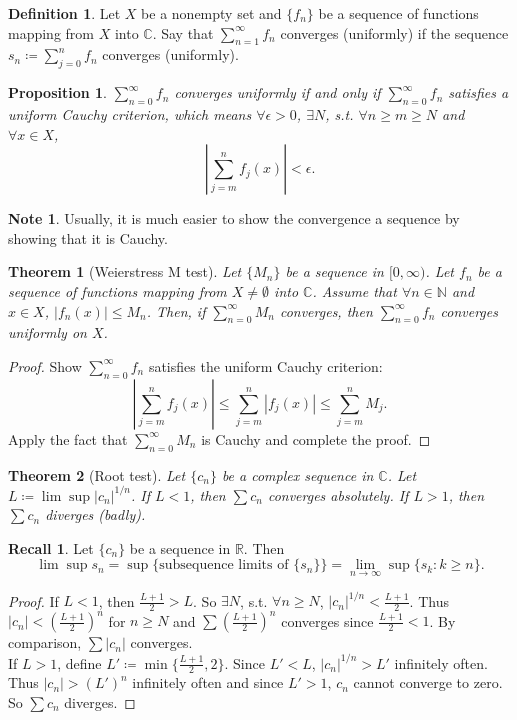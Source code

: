 \documentclass[12pt]{article}
\theoremstyle{plain}
\newtheorem{thm}{Theorem}
\newtheorem*{prop}{Proposition}
\theoremstyle{definition}
\newtheorem*{defn}{Definition}
\newtheorem*{note}{Note}
\newtheorem*{recall}{Recall}
\begin{document}
\begin{defn}
    Let $X$ be a nonempty set and $\{f_n\}$ be a sequence of functions mapping from $X$
    into $\mathbb{C}$.
    Say that $\sum_{n=1}^\infty f_n$ converges (uniformly) if the sequence
    $s_n\coloneqq\sum_{j=0}^n f_n$ converges (uniformly).
\end{defn}

\begin{prop}
    $\sum_{n=0}^\infty f_n$ converges uniformly if and only if
    $\sum_{n=0}^\infty f_n$ satisfies a uniform Cauchy criterion, which means
    $\forall \epsilon>0$, $\exists N$, s.t. $\forall n\geq m\geq N$ and $\forall
    x\in X$, 
    $$\left|\sum_{j=m}^n f_j(x)\right|<\epsilon.$$
\end{prop}
\begin{note}
    Usually, it is much easier to show the convergence a sequence by showing
    that it is Cauchy.
\end{note}

\begin{thm}[Weierstress M test]
    Let $\{M_n\}$ be a sequence in $[0,\infty)$.
    Let $f_n$ be a sequence of functions mapping from $X\neq\emptyset$ into
    $\mathbb{C}$.
    Assume that $\forall n\in \mathbb{N}$ and $x\in X$, $|f_n(x)|\leq M_n$.
    Then, if $\sum_{n=0}^\infty M_n$ converges, then $\sum_{n=0}^\infty f_n$ converges
    uniformly on $X$.
\end{thm}
\begin{proof}
    Show $\sum_{n=0}^\infty f_n$ satisfies the uniform Cauchy criterion:
    $$\left|\sum_{j=m}^n f_j(x)\right|
    \leq \sum_{j=m}^n\left|f_j(x)\right|
    \leq\sum_{j=m}^n M_j.$$
    Apply the fact that $\sum_{n=0}^\infty M_n$ is Cauchy and complete the proof.
\end{proof}

\begin{thm}[Root test]
    Let $\{c_n\}$ be a complex sequence in $\mathbb{C}$.
    Let $L\coloneqq \lim\sup|c_n|^{1/n}$.
    If $L<1$, then $\sum c_n$ converges absolutely.
    If $L>1$, then $\sum c_n$ diverges (badly).
\end{thm}
\begin{recall}
    Let $\{c_n\}$ be a sequence in $\mathbb{R}$.
    Then
    $$\lim\sup s_n = \sup\{\text{subsequence limits of }\{s_n\}\}
    =\lim_{n\rightarrow\infty}\sup\{s_k:k\geq n\}.$$
\end{recall}
\begin{proof}
    If $L<1$, then
    $\frac{L+1}{2}>L$.
    So $\exists N$, s.t. $\forall n\geq N$, $|c_n|^{1/n}<\frac{L+1}{2}$.
    Thus $|c_n|<\left(\frac{L+1}{2}\right)^n$ for $n\geq N$ and
    $\sum\left(\frac{L+1}{2}\right)^n$ converges since $\frac{L+1}{2}<1$.
    By comparison, $\sum|c_n|$ converges.\\
    If $L>1$, define $L'\coloneqq \min\{\frac{L+1}{2},2\}$.
    Since $L'<L$, $|c_n|^{1/n}>L'$ infinitely often.
    Thus $|c_n|>(L')^n$ infinitely often and since $L'>1$, $c_n$ cannot converge
    to zero. So $\sum c_n$ diverges.
\end{proof}
\end{document}
